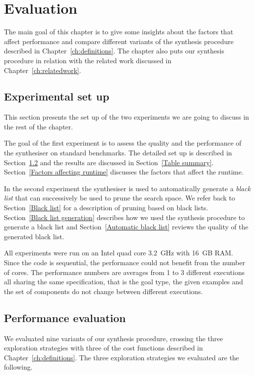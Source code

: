 \lstset{style=plain}

\chapter{Evaluation} \label{evaluation}

The main goal of this chapter is to give some insights about the factors that affect performance and compare different variants of the synthesis procedure described in Chapter~\ref{ch:definitions}. The chapter also puts our synthesis procedure in relation with the related work discussed in Chapter~\ref{ch:relatedwork}.


\section{Experimental set up}
This section presents the set up of the two experiments we are going to discuss in the rest of the chapter.

The goal of the first experiment is to assess the quality and the performance of the synthesiser on standard benchmarks. The detailed set up is described in Section~\ref{Evaluation on benchmarks} and the results are discussed in Section~\ref{Table summary}. Section~\ref{Factors affecting runtime} discusses the factors that affect the runtime.

In the second experiment the synthesiser is used to automatically generate a \emph{black list} that can successively be used to prune the search space. We refer back to Section~\ref{Black list} for a description of pruning based on black lists. Section~\ref{Black list generation} describes how we used the synthesis procedure to generate a black list and Section~\ref{Automatic black list} reviews the quality of the generated black list.

All experiments were run on an Intel quad core 3.2~GHz with 16~GB RAM. Since the code is sequential, the performance could not benefit from the number of cores. The performance numbers are averages from 1 to 3 different executions all sharing the same specification, that is the goal type, the given examples and the set of components do not change between different executions.

\section{Performance evaluation}\label{Evaluation on benchmarks}

We evaluated nine variants of our synthesis procedure, crossing the three exploration strategies with three of the cost functions described in Chapter~\ref{ch:definitions}. The three exploration strategies we evaluated are the following.

